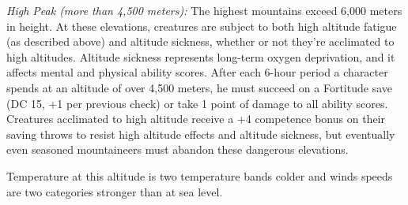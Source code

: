 \textit{High Peak (more than 4,500 meters):} The highest mountains exceed 6,000 meters in height. At these elevations, creatures are subject to both high altitude fatigue (as described above) and altitude sickness, whether or not they're acclimated to high altitudes. Altitude sickness represents long-term oxygen deprivation, and it affects mental and physical ability scores. After each 6-hour period a character spends at an altitude of over 4,500 meters, he must succeed on a Fortitude save (DC 15, +1 per previous check) or take 1 point of damage to all ability scores. Creatures acclimated to high altitude receive a +4 competence bonus on their saving throws to resist high altitude effects and altitude sickness, but eventually even seasoned mountaineers must abandon these dangerous elevations.

Temperature at this altitude is two temperature bands colder and winds speeds are two categories stronger than at sea level.

